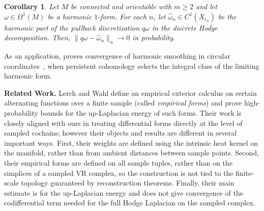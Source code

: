 \documentclass[11pt,reqno]{amsproc}
\numberwithin{equation}{section}
\newtheorem{corollary}[counter]{Corollary}
\theoremstyle{definition}
\theoremstyle{plain}
\begin{document}
\begin{corollary} \label{cor:intro_harmonic_convergence}
    Let $M$ be connected and orientable with $m\geq2$ and let $\omega \in \Omega^1(M)$ be a harmonic $1$-form. For each $n$, let $\hat{\omega}_n \in C^1(X_{\epsilon_n})$ be the harmonic part of the pullback discretization $q\omega$ in the discrete Hodge decomposition. Then, $\|q\omega - \hat{\omega}_n\|_n \to 0$ in probability. 
\end{corollary}

As an application,  proves convergence of harmonic smoothing in circular coordinates~\cite{deSilva2011}, when persistent cohomology selects the integral class of the limiting harmonic form. \medskip


\textbf{Related Work.}
Lerch and Wahl \cite{lerch_empirical_2025} define an empirical exterior calculus on certain alternating functions over a finite sample (called \emph{empirical forms}) and prove high-probability bounds for the up-Laplacian energy of such forms. Their work is closely aligned with ours in treating differential forms directly at the level of sampled cochains; however their objects and results are different in several important ways. First, their weights are defined using the intrinsic heat kernel on the manifold, rather than from ambient distances between sample points. Second, their empirical forms are defined on all sample tuples, rather than on the simplices of a sampled VR complex, so the construction is not tied to the finite-scale topology guaranteed by reconstruction theorems.
Finally, their main estimate is for the up-Laplacian energy and does not give convergence of the codifferential term needed for the full Hodge Laplacian on the sampled complex.
\end{document}
